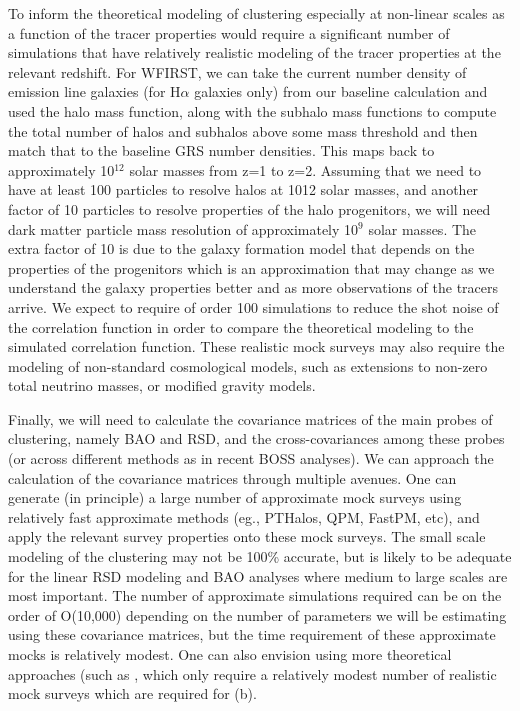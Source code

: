  To inform the theoretical modeling of clustering especially at non-linear
 scales as a function of the tracer properties would require a significant number
 of simulations that have relatively realistic modeling of the tracer properties
 at the relevant redshift.  For WFIRST, we can take the current number density of
 emission line galaxies (for H$\alpha$ galaxies only) from our baseline
 calculation and used the \citet{Tinker2008} halo mass function, along with the
 \citet{Giocoli2008} subhalo mass functions to compute the total number of
 halos and subhalos above some mass threshold and then match that to the baseline
 GRS number densities. This maps back to approximately 10$^12$ solar masses from z=1 to z=2. Assuming that we need to have at least 100 particles to resolve halos at
 1012 solar masses, and another factor of 10 particles to resolve properties of
 the halo progenitors, we will need dark matter particle mass resolution of
 approximately 10$^9$ solar masses. The extra factor of 10 is due to the galaxy
 formation model that depends on the properties of the progenitors which is an
 approximation that may change as we understand the galaxy properties better and
 as more observations of the tracers arrive. We expect to require of order 100
 simulations to reduce the shot noise of the correlation function in order to
 compare the theoretical modeling to the simulated correlation function. These
 realistic mock surveys may also require the modeling of non-standard
 cosmological  models, such as extensions to non-zero total neutrino masses, or
 modified gravity models.

 Finally, we will need to calculate the covariance matrices of the main probes of
 clustering, namely BAO and RSD, and the cross-covariances among these probes
 (or across different methods as in recent BOSS analyses). We can approach the
 calculation of the covariance matrices through multiple avenues. One can
 generate (in principle) a large number of approximate mock surveys using
 relatively fast approximate methods (eg., PTHalos, QPM, FastPM, etc), and apply
 the relevant survey properties onto these mock surveys. The small scale modeling
 of the clustering may not be 100\% accurate, but is likely to be adequate for
 the linear RSD modeling and BAO analyses where medium to large scales are most
 important. The number of approximate simulations required can be on the order of
 O(10,000) depending on the number of parameters we will be estimating using
 these covariance matrices, but the time requirement of these approximate mocks
 is relatively modest. One can also envision using more theoretical approaches
 (such as \citet{OConnell:2015src,Padmanabhan2016,Friedrich:2015nga}, which only require a relatively modest number of realistic mock surveys which are required for (b).


